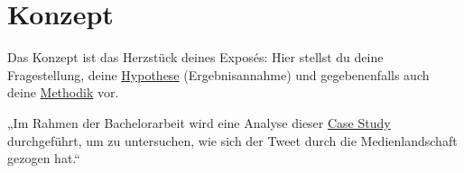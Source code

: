 
\section{Konzept}
\label{sec:konzept}


Das Konzept ist das Herzstück deines Exposés: Hier stellst du deine Fragestellung, deine \href{https://www.scribbr.de/methodik/hypothesen-formulieren/}{Hypothese} (Ergebnisannahme) und gegebenenfalls auch deine \href{https://www.scribbr.de/category/methodik/}{Methodik} vor.

„Im Rahmen der Bachelorarbeit wird eine Analyse dieser \href{https://www.scribbr.de/methodik/fallstudie/}{Case Study} durchgeführt, um zu untersuchen, wie sich der Tweet durch die Medienlandschaft gezogen hat.“

